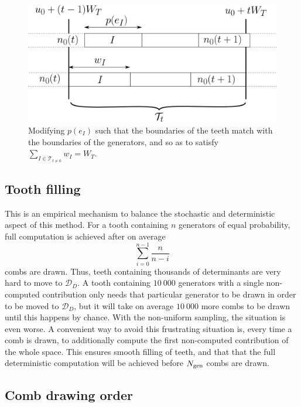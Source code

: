 \documentclass[./thesis.tex]{subfiles}
\begin{document}
\begin{figure}[h!]
	\begin{center}
		\includegraphics[width=0.9\columnwidth]{figures/pt2/toothbuilding}
	\end{center}
	\caption{Modifying $p(e_I)$ such that the boundaries of the teeth match with the boundaries of the generators, and so as to satisfy $\sum_{I \in \mathcal{T}_{t \neq 0}} w_I = W_T$.}
        \label{fig:toothbuilding}
\end{figure}





\subsection{Tooth filling}

This is an empirical mechanism to balance the stochastic and deterministic aspect of this method. For a tooth containing $n$ generators of equal probability, full computation is achieved after on average
\begin{equation}
\sum_{i=0}^{n-1} \frac{n}{n-i}
\end{equation}
combs are drawn. Thus, teeth containing thousands of determinants are very hard to move to $\mathcal{D}_D$. A tooth containing $10~000$ generators with a single non-computed contribution only needs that particular generator to be drawn in order to be moved to $\mathcal{D}_D$, but it will take on average $10~000$ more combs to be drawn until this happens by chance. With the non-uniform sampling, the situation is even worse.
A convenient way to avoid this frustrating situation is, every time a comb is drawn, to additionally compute the first non-computed contribution of the whole space. This ensures smooth filling of teeth, and that that the full deterministic computation will be achieved before ${N_\text{gen}}$ combs are drawn.


\subsection{Comb drawing order}
\end{document}
